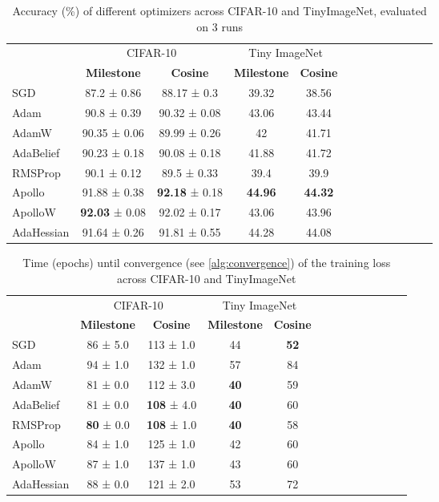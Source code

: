 \begin{table}[h!]
    \centering
    \caption{Accuracy (\%) of different optimizers across CIFAR-10 and TinyImageNet, evaluated on 3 runs}
    \label{tab:optimizer_comparison_acc}
    \begin{tabular}{lcccccccccccc}
        \toprule
        & \multicolumn{2}{c}{CIFAR-10} & \multicolumn{2}{c}{Tiny ImageNet} \\
        \cmidrule(lr){2-3} \cmidrule(lr){4-5}  \cmidrule(lr){6-7} 
        & \textbf{Milestone} & \textbf{Cosine}  & \textbf{Milestone} & \textbf{Cosine}    \\
        \midrule
        SGD         & 87.2 ± 0.86  & 88.17 ± 0.3 & 39.32  & 38.56  \\
        Adam        & 90.8 ± 0.39   & 90.32 ± 0.08  & 43.06 & 43.44    \\
        AdamW       & 90.35 ± 0.06  & 89.99 ± 0.26 & 42  & 41.71 \\
        AdaBelief   & 90.23 ± 0.18  & 90.08 ± 0.18 & 41.88 & 41.72 \\
        RMSProp     & 90.1 ± 0.12   & 89.5 ± 0.33  & 39.4 & 39.9\\
        Apollo      & 91.88 ± 0.38 & \textbf{92.18} ± 0.18  & \textbf{44.96}  & \textbf{44.32}    \\
        ApolloW     & \textbf{92.03} ± 0.08 & 92.02 ± 0.17  & 43.06  & 43.96  \\
        AdaHessian  & 91.64 ± 0.26    &  91.81 ± 0.55 &  44.28& 44.08  \\
        \bottomrule
    \end{tabular}
\end{table}

\begin{table}[h!]
    \centering
    \caption{Time (epochs) until convergence (see \ref{alg:convergence}) of the training loss across CIFAR-10 and TinyImageNet}
    \label{tab:optimizer_comparison_ttc}
    \begin{tabular}{lcccccccccccc}
        \toprule
        & \multicolumn{2}{c}{CIFAR-10} & \multicolumn{2}{c}{Tiny ImageNet} \\
        \cmidrule(lr){2-3} \cmidrule(lr){4-5}  \cmidrule(lr){6-7} 
        & \textbf{Milestone} & \textbf{Cosine}  & \textbf{Milestone} & \textbf{Cosine}    \\
        \midrule
        SGD         & 86 ± 5.0 & 113 ± 1.0 & 44 & \textbf{52} \\
        Adam        & 94 ± 1.0 & 132 ± 1.0& 57 & 84  \\
        AdamW       & 81 ± 0.0 & 112 ± 3.0& \textbf{40} & 59 \\
        AdaBelief   & 81 ± 0.0  &  \textbf{108} ± 4.0& \textbf{40} & 60 \\
        RMSProp     & \textbf{80} ± 0.0  & \textbf{108} ± 1.0& \textbf{40} & 58\\
        Apollo      & 84 ± 1.0 & 125 ± 1.0& 42 & 60   \\
        ApolloW     & 87 ± 1.0 & 137 ± 1.0& 43 & 60  \\
        AdaHessian  & 88 ± 0.0 & 121 ± 2.0& 53 & 72 \\
        \bottomrule
    \end{tabular}
\end{table}
